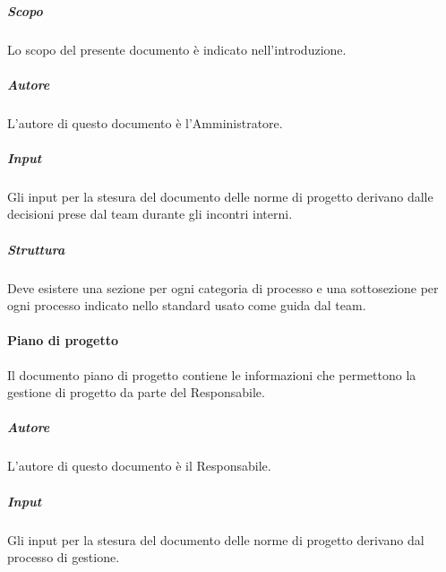 \subparagraph{Scopo}
Lo scopo del presente documento è indicato nell'introduzione.

\subparagraph{Autore} 
L'autore di questo documento è l'Amministratore.

\subparagraph{Input}
Gli input per la stesura del documento delle norme di progetto derivano dalle decisioni prese dal team durante gli incontri interni.

\subparagraph{Struttura}
Deve esistere una sezione per ogni categoria di processo e una sottosezione per ogni processo indicato nello standard  usato come guida dal team.

\paragraph{Piano di progetto}
Il documento piano di progetto contiene le informazioni che permettono la gestione di progetto da parte del Responsabile.

\subparagraph{Autore} 
L’autore di questo documento è il Responsabile.

\subparagraph{Input}
Gli input per la stesura del documento delle norme di progetto derivano dal processo di gestione.

